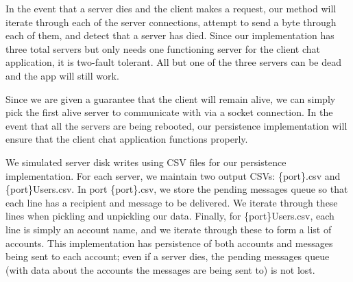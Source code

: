 \documentclass[
	a4paper, %
	10pt, %
	unnumberedsections, %
	twoside, %
]{LTJournalArticle}
\begin{document}
In the event that a server dies and the client makes a request, our method will iterate through each of the server connections, attempt to send a byte through each of them, and detect that a server has died. Since our implementation has three total servers but only needs one functioning server for the client chat application, it is two-fault tolerant. All but one of the three servers can be dead and the app will still work.

Since we are given a guarantee that the client will remain alive, we can simply pick the first alive server to communicate with via a socket connection. In the event that all the servers are being rebooted, our persistence implementation will ensure that the client chat application functions properly. 

We simulated server disk writes using CSV files for our persistence implementation. For each server, we maintain two output CSVs: \{port\}.csv and \{port\}Users.csv. In port \{port\}.csv, we store the pending messages queue so that
each line has a recipient and message to be delivered. 
We iterate through these lines when pickling and unpickling our data. Finally, for \{port\}Users.csv, each line is simply an account name, and we iterate through these to form a list of accounts. This implementation has persistence of both accounts and messages being sent to each account; even if a server dies, the pending messages queue (with data about the accounts the messages are being sent to) is not lost.
\end{document}
